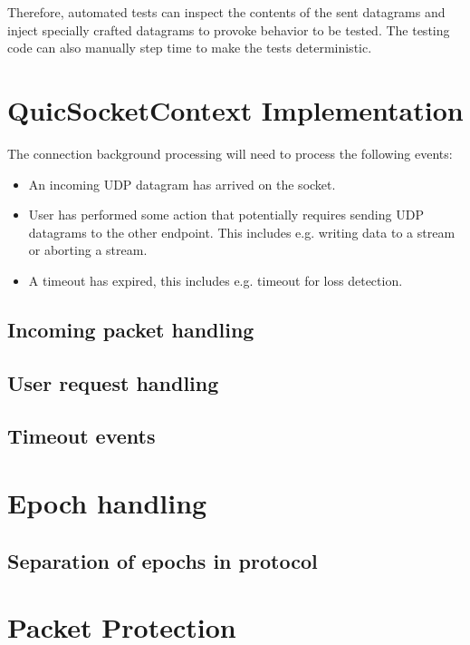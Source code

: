 Therefore, automated tests can inspect the contents of the sent datagrams and inject specially
crafted datagrams to provoke behavior to be tested. The testing code can also manually step time to
make the tests deterministic.

\section{QuicSocketContext Implementation}

The connection background processing will need to process the following events:

\begin{itemize}

  \item An incoming UDP datagram has arrived on the socket.

  \item User has performed some action that potentially requires sending UDP datagrams to the other
    endpoint. This includes e.g. writing data to a stream or aborting a stream.

  \item A timeout has expired, this includes e.g. timeout for loss detection.

\end{itemize}

\subsection{Incoming packet handling}

\subsection{User request handling}
\subsection{Timeout events}


\section{Epoch handling}
\subsection{Separation of epochs in protocol}

\section{Packet Protection}

